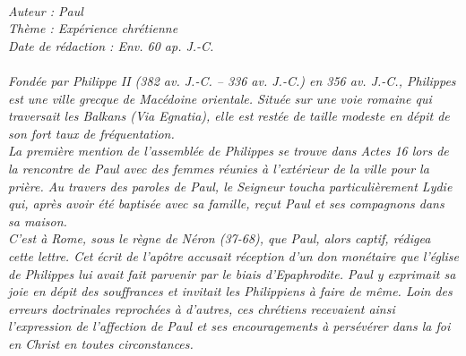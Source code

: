 \BFont
\noindent\hrulefill
{\footnotesize
\textit{
\bigskip
{\centering{}
\\Auteur : Paul
\\Thème : Expérience chrétienne
\\Date de rédaction : Env. 60 ap. J.-C.\\}
}
\textit{
\\Fondée par Philippe II (382 av. J.-C. – 336 av. J.-C.) en 356 av. J.-C., Philippes est une ville grecque de Macédoine orientale. Située sur une voie romaine qui traversait les Balkans (Via Egnatia), elle est restée de taille modeste en dépit de son fort taux de fréquentation.
\\La première mention de l’assemblée de Philippes se trouve dans Actes 16 lors de la rencontre de Paul avec  des femmes réunies à l’extérieur  de la ville pour la prière. Au travers des paroles de Paul, le Seigneur toucha particulièrement Lydie qui, après avoir été baptisée avec sa famille,  reçut Paul et ses compagnons dans sa maison.
\\C’est à Rome, sous le règne de Néron (37-68), que Paul, alors captif, rédigea cette lettre. Cet écrit de l’apôtre accusait réception d’un don monétaire que l’église de Philippes lui avait fait parvenir par le biais d’Epaphrodite. Paul y exprimait sa joie en dépit des souffrances et invitait les Philippiens à faire de même. Loin des erreurs doctrinales reprochées à d’autres, ces chrétiens recevaient ainsi l’expression de l’affection de Paul et ses encouragements à persévérer dans la foi en Christ en toutes circonstances.\bigskip
}
}
\par\nobreak\noindent\hrulefill
